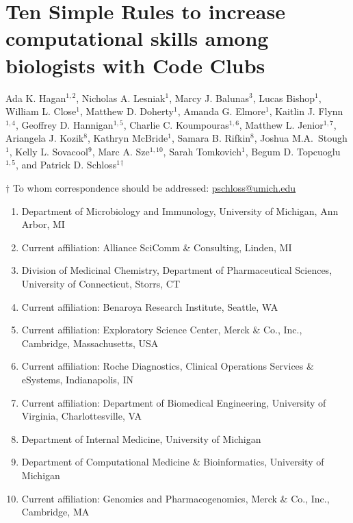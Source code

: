 \documentclass[
  11pt,
]{article}
\author{}
\date{\vspace{-2.5em}}
\providecommand{\tightlist}{%
  \setlength{\itemsep}{0pt}\setlength{\parskip}{0pt}}
\begin{document}
\hypertarget{ten-simple-rules-to-increase-computational-skills-among-biologists-with-code-clubs}{%
\section{Ten Simple Rules to increase computational skills among
biologists with Code
Clubs}\label{ten-simple-rules-to-increase-computational-skills-among-biologists-with-code-clubs}}

\vspace{5mm}

Ada K. Hagan\({^{1,2}}\), Nicholas A. Lesniak\({^1}\), Marcy J.
Balunas\({^3}\), Lucas Bishop\({^1}\), William L. Close\({^1}\), Matthew
D. Doherty\({^1}\), Amanda G. Elmore\({^1}\), Kaitlin J.
Flynn\({^{1,4}}\), Geoffrey D. Hannigan\({^{1,5}}\), Charlie C.
Koumpouras\({^{1,6}}\), Matthew L. Jenior\({^{1,7}}\), Ariangela J.
Kozik\({^8}\), Kathryn McBride\({^1}\), Samara B. Rifkin\({^8}\), Joshua
M.A.~Stough\({^1}\), Kelly L. Sovacool\({^9}\), Marc A.
Sze\({^{1,10}}\), Sarah Tomkovich\({^1}\), Begum D.
Topcuoglu\({^{1,5}}\), and Patrick D. Schloss\({^1}\)\({^\dagger}\)

\vspace{5mm}

\(\dagger\) To whom correspondence should be addressed:
\href{mailto:pschloss@umich.edu}{pschloss@umich.edu}

\begin{enumerate}
\def\labelenumi{\arabic{enumi}.}
\tightlist
\item
  Department of Microbiology and Immunology, University of Michigan, Ann
  Arbor, MI
\item
  Current affiliation: Alliance SciComm \& Consulting, Linden, MI
\item
  Division of Medicinal Chemistry, Department of Pharmaceutical
  Sciences, University of Connecticut, Storrs, CT
\item
  Current affiliation: Benaroya Research Institute, Seattle, WA
\item
  Current affiliation: Exploratory Science Center, Merck \& Co., Inc.,
  Cambridge, Massachusetts, USA
\item
  Current affiliation: Roche Diagnostics, Clinical Operations Services
  \& eSystems, Indianapolis, IN
\item
  Current affiliation: Department of Biomedical Engineering, University
  of Virginia, Charlottesville, VA
\item
  Department of Internal Medicine, University of Michigan
\item
  Department of Computational Medicine \& Bioinformatics, University of
  Michigan
\item
  Current affiliation: Genomics and Pharmacogenomics, Merck \& Co.,
  Inc., Cambridge, MA
\end{enumerate}
\end{document}
